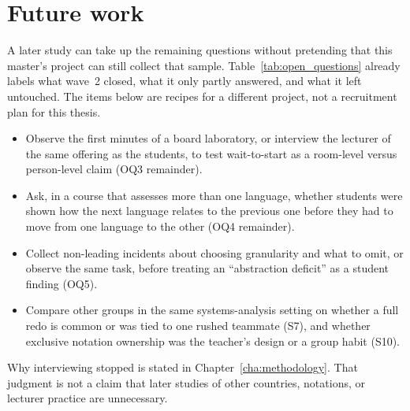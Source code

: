 \section{Future work}
\label{sec:disc_future}

A later study can take up the remaining questions without pretending that this master's project can still collect that sample. Table~\ref{tab:open_questions} already labels what wave~2 closed, what it only partly answered, and what it left untouched. The items below are recipes for a different project, not a recruitment plan for this thesis.

\begin{itemize}
    \item Observe the first minutes of a board laboratory, or interview the lecturer of the same offering as the students, to test wait-to-start as a room-level versus person-level claim (OQ3 remainder).
    \item Ask, in a course that assesses more than one language, whether students were shown how the next language relates to the previous one before they had to move from one language to the other (OQ4 remainder).
    \item Collect non-leading incidents about choosing granularity and what to omit, or observe the same task, before treating an ``abstraction deficit'' as a student finding (OQ5).
    \item Compare other groups in the same systems-analysis setting on whether a full redo is common or was tied to one rushed teammate (S7), and whether exclusive notation ownership was the teacher's design or a group habit (S10).
\end{itemize}

Why interviewing stopped is stated in Chapter~\ref{cha:methodology}. That judgment is not a claim that later studies of other countries, notations, or lecturer practice are unnecessary.
